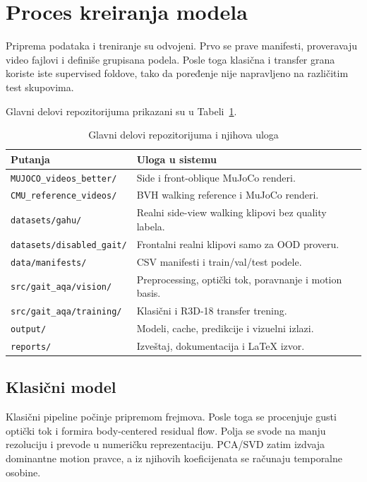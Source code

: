 \documentclass[12pt,a4paper]{report}
\begin{document}
\section{Proces kreiranja modela}

Priprema podataka i treniranje su odvojeni. Prvo se prave manifesti, proveravaju
video fajlovi i definiše grupisana podela. Posle toga klasična i transfer grana
koriste iste supervised foldove, tako da poređenje nije napravljeno na
različitim test skupovima.

Glavni delovi repozitorijuma prikazani su u Tabeli~\ref{tab:repo-parts}.

\begin{table}[H]
  \centering
  \caption{Glavni delovi repozitorijuma i njihova uloga}
  \label{tab:repo-parts}
  \footnotesize
  \begin{tabular}{p{5.3cm}p{7.6cm}}
    \toprule
    Putanja & Uloga u sistemu \\
    \midrule
    \texttt{MUJOCO\_videos\_better/} & Side i front-oblique MuJoCo renderi. \\
    \texttt{CMU\_reference\_videos/} & BVH walking reference i MuJoCo renderi. \\
    \texttt{datasets/gahu/} & Realni side-view walking klipovi bez quality labela. \\
    \texttt{datasets/disabled\_gait/} & Frontalni realni klipovi samo za OOD proveru. \\
    \texttt{data/manifests/} & CSV manifesti i train/val/test podele. \\
    \texttt{src/gait\_aqa/vision/} & Preprocessing, optički tok, poravnanje i motion basis. \\
    \texttt{src/gait\_aqa/training/} & Klasični i R3D-18 transfer trening. \\
    \texttt{output/} & Modeli, cache, predikcije i vizuelni izlazi. \\
    \texttt{reports/} & Izveštaj, dokumentacija i LaTeX izvor. \\
    \bottomrule
  \end{tabular}
\end{table}

\subsection{Klasični model}

Klasični pipeline počinje pripremom frejmova. Posle toga se procenjuje gusti
optički tok i formira body-centered residual flow. Polja se svode na manju
rezoluciju i prevode u numeričku reprezentaciju. PCA/SVD zatim izdvaja
dominantne motion pravce, a iz njihovih koeficijenata se računaju temporalne
osobine.
\end{document}
